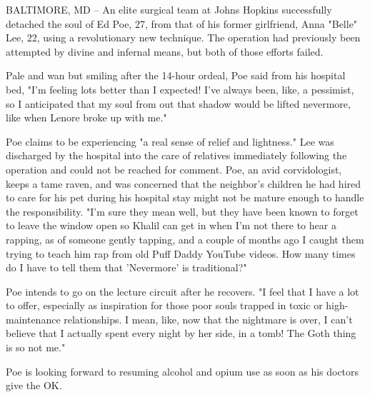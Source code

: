 
BALTIMORE, MD -- An elite surgical team at Johns Hopkins successfully
detached the soul of Ed Poe, 27, from that of his former girlfriend,
Anna "Belle" Lee, 22, using a revolutionary new technique. The operation
had previously been attempted by divine and infernal means, but both of
those efforts failed.

Pale and wan but smiling after the 14-hour ordeal, Poe said from his
hospital bed, "I'm feeling lots better than I expected! I've always
been, like, a pessimist, so I anticipated that my soul from out that
shadow would be lifted nevermore, like when Lenore broke up with me."

Poe claims to be experiencing "a real sense of relief and lightness."
Lee was discharged by the hospital into the care of relatives
immediately following the operation and could not be reached for
comment. Poe, an avid corvidologist, keeps a tame raven, and was
concerned that the neighbor's children he had hired to care for his pet
during his hospital stay might not be mature enough to handle the
responsibility. "I'm sure they mean well, but they have been known to
forget to leave the window open so Khalil can get in when I'm not there
to hear a rapping, as of someone gently tapping, and a couple of months
ago I caught them trying to teach him rap from old Puff Daddy YouTube
videos. How many times do I have to tell them that 'Nevermore' is
traditional?"

Poe intends to go on the lecture circuit after he recovers. "I feel that
I have a lot to offer, especially as inspiration for those poor souls
trapped in toxic or high-maintenance relationships. I mean, like, now
that the nightmare is over, I can't believe that I actually spent every
night by her side, in a tomb! The Goth thing is so not me."

Poe is looking forward to resuming alcohol and opium use as soon as his
doctors give the OK.
